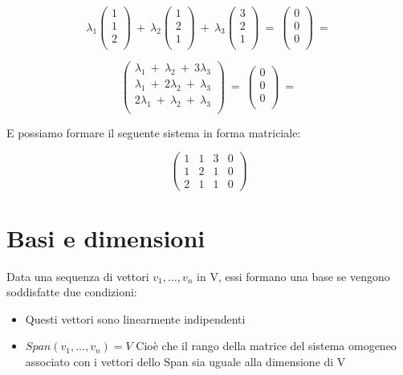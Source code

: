 \documentclass[a4paper, 10pt]{article}
\begin{document}
$$ \lambda_1\left(\begin{matrix}1\\1\\2\\\end{matrix}\right)\ +\ \lambda_2\left(\begin{matrix}1\\2\\1\\\end{matrix}\right)\ +\ \lambda_3\left(\begin{matrix}3\\2\\1\\\end{matrix}\right)\ =\ \left(\begin{matrix}0\\0\\0\\\end{matrix}\right)\ = $$

$$ \left(\begin{matrix}\lambda_1\ +\ \lambda_2\ +\ 3\lambda_3\\\lambda_1\ +\ 2\lambda_2\ +\ \lambda_3\\2\lambda_1\ +\ \lambda_2\ +\ \lambda_3\\\end{matrix}\right)\ =\ \left(\begin{matrix}0\\0\\0\\\end{matrix}\right)\ = $$

E possiamo formare il seguente sistema in forma matriciale:

$$ \begin{pmatrix}
	1 & 1 & 3 & 0 \\
	1 & 2 & 1 & 0 \\
	2 & 1 & 1 & 0 
\end{pmatrix}  $$


\section{Basi e dimensioni}

Data una sequenza di vettori $v_1, ..., v_n$ in V, essi formano una base se vengono soddisfatte due condizioni:

\begin{itemize}
	\item Questi vettori sono linearmente indipendenti
	\item $Span(v_1, ..., v_n) = V$ Cioè che il rango della matrice del sistema omogeneo associato con i vettori dello Span sia uguale alla dimensione di V
\end{itemize}
\end{document}
